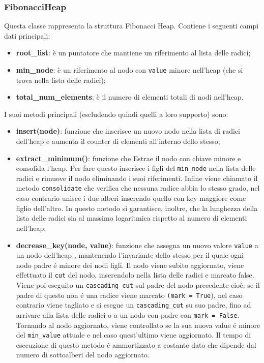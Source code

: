\subsubsection{FibonacciHeap}
Questa classe rappresenta la struttura Fibonacci Heap. Contiene i seguenti campi dati principali:
\begin{itemize}
	\item \textbf{root\_list}: è un puntatore che mantiene un riferimento al lista delle radici;
	\item \textbf{min\_node}: è un riferimento al nodo con \texttt{value} minore nell'heap (che si trova nella lista delle radici);
	\item \textbf{total\_num\_elements}: è il numero di elementi totali di nodi nell'heap.
\end{itemize}
I suoi metodi principali (escludendo quindi quelli a loro supporto) sono:
\begin{itemize}
	\item \textbf{insert(node)}: funzione che inserisce un nuovo nodo nella lista di radici dell'heap e aumenta il counter di elementi all'interno dello stesso;
	\item \textbf{extract\_minimum()}: funzione che Estrae il nodo con chiave minore e consolida l'heap. Per fare questo inserisce i figli del \texttt{min\_node} nella lista delle radici e rimuove il nodo eliminando i suoi riferimenti. Infine viene chiamato il metodo \texttt{consolidate} che verifica che nessuna radice abbia lo stesso grado, nel caso contrario unisce i due alberi inserendo quello con key maggiore come figlio dell'altro. In questo metodo si garantisce, inoltre, che la lunghezza della lista delle radici sia al massimo logaritmica rispetto al numero di elementi nell'heap;
	\item \textbf{decrease\_key(node, value)}: funzione che assegna un nuovo valore \texttt{value} a un nodo dell'heap , mantenendo l'invariante dello stesso per il quale ogni nodo padre é minore dei nodi figli. Il nodo viene subito aggiornato, viene effettuato il \texttt{cut} del nodo, inserendolo nella lista delle radici e marcato false. Viene poi eseguito un \texttt{cascading\_cut} sul padre del nodo precedente cioè: se il padre di questo non é una radice viene marcato \texttt{(mark = True}), nel caso contrario viene tagliato e si esegue un \texttt{cascading\_cut} su suo padre, fino ad arrivare alla lista delle radici o a un nodo con padre con \texttt{mark = False}. Tornando al nodo aggiornato, viene controllato se la sua nuova value é minore del \texttt{min\_value} attuale e nel caso quest'ultimo viene aggiornato. Il tempo di esecuzione di questo metodo é ammortizzato a costante dato che dipende dal numero di sottoalberi del nodo aggiornato.
\end{itemize}
